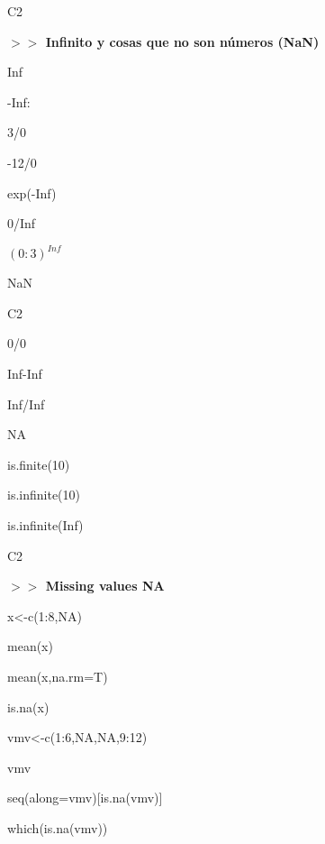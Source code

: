 \documentclass{beamer}
\theoremstyle{definition}
\theoremstyle{remark}
\begin{document}
\begin{frame}{C2}

\textbf{$>>$ Infinito y cosas que no son n\'umeros (NaN)}

\hfill

Inf

\hfill

-Inf:

\hfill

3/0

\hfill

-12/0

\hfill

exp(-Inf)

\hfill

0/Inf

\hfill

$(0:3)^{Inf}$

\hfill

NaN

\hfill





\end{frame}

\begin{frame}{C2}

0/0

\hfill

Inf-Inf

\hfill

Inf/Inf

\hfill

NA 

\hfill

is.finite(10)

\hfill

is.infinite(10)

\hfill

is.infinite(Inf)


\end{frame}

\begin{frame}{C2}

\textbf{$>>$ Missing values NA}

\hfill

x<-c(1:8,NA)

mean(x)

\hfill

mean(x,na.rm=T)

\hfill

is.na(x) 

\hfill

vmv<-c(1:6,NA,NA,9:12)

vmv

\hfill

seq(along=vmv)[is.na(vmv)]

\hfill

which(is.na(vmv))


\end{frame}
\end{document}
